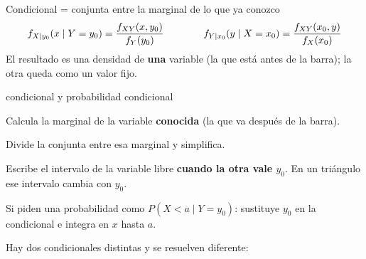 \begin{idea}{Condicional = conjunta entre la marginal de lo que ya conozco}
\[
f_{X\mid y_0}(x\mid Y=y_0)=\frac{f_{XY}(x,y_0)}{f_Y(y_0)}
\qquad\qquad
f_{Y\mid x_0}(y\mid X=x_0)=\frac{f_{XY}(x_0,y)}{f_X(x_0)}
\]
El resultado es una densidad de \textbf{una} variable (la que est\'a antes de la barra); la otra queda como un valor fijo.
\end{idea}




\begin{receta}{condicional y probabilidad condicional}
\begin{pasosreceta}
\item Calcula la marginal de la variable \textbf{conocida} (la que va despu\'es de la barra).
\item Divide la conjunta entre esa marginal y simplifica.
\item Escribe el intervalo de la variable libre \textbf{cuando la otra vale $y_0$}. En un tri\'angulo ese intervalo cambia con $y_0$.
\item Si piden una probabilidad como $P(X<a\mid Y=y_0)$: sustituye $y_0$ en la condicional e integra en $x$ hasta $a$.
\end{pasosreceta}
\end{receta}

\begin{ojo}
Hay dos condicionales distintas y se resuelven diferente:
\end{ojo}

